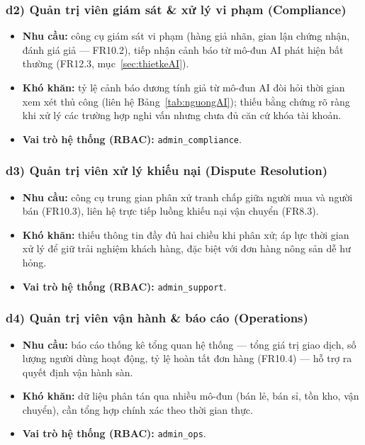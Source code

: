 \subsubsection*{d2) Quản trị viên giám sát \& xử lý vi phạm (Compliance)}
\begin{itemize}
    \item \textbf{Nhu cầu:} công cụ giám sát vi phạm (hàng giả nhãn, gian lận chứng nhận, đánh giá giả --- FR10.2), tiếp nhận cảnh báo từ mô-đun AI phát hiện bất thường (FR12.3, mục~\ref{sec:thietkeAI}).
    \item \textbf{Khó khăn:} tỷ lệ cảnh báo dương tính giả từ mô-đun AI đòi hỏi thời gian xem xét thủ công (liên hệ Bảng~\ref{tab:nguongAI}); thiếu bằng chứng rõ ràng khi xử lý các trường hợp nghi vấn nhưng chưa đủ căn cứ khóa tài khoản.
    \item \textbf{Vai trò hệ thống (RBAC):} \texttt{admin\_compliance}.
\end{itemize}

\subsubsection*{d3) Quản trị viên xử lý khiếu nại (Dispute Resolution)}
\begin{itemize}
    \item \textbf{Nhu cầu:} công cụ trung gian phân xử tranh chấp giữa người mua và người bán (FR10.3), liên hệ trực tiếp luồng khiếu nại vận chuyển (FR8.3).
    \item \textbf{Khó khăn:} thiếu thông tin đầy đủ hai chiều khi phân xử; áp lực thời gian xử lý để giữ trải nghiệm khách hàng, đặc biệt với đơn hàng nông sản dễ hư hỏng.
    \item \textbf{Vai trò hệ thống (RBAC):} \texttt{admin\_support}.
\end{itemize}

\subsubsection*{d4) Quản trị viên vận hành \& báo cáo (Operations)}
\begin{itemize}
    \item \textbf{Nhu cầu:} báo cáo thống kê tổng quan hệ thống --- tổng giá trị giao dịch, số lượng người dùng hoạt động, tỷ lệ hoàn tất đơn hàng (FR10.4) --- hỗ trợ ra quyết định vận hành sàn.
    \item \textbf{Khó khăn:} dữ liệu phân tán qua nhiều mô-đun (bán lẻ, bán sỉ, tồn kho, vận chuyển), cần tổng hợp chính xác theo thời gian thực.
    \item \textbf{Vai trò hệ thống (RBAC):} \texttt{admin\_ops}.
\end{itemize}


